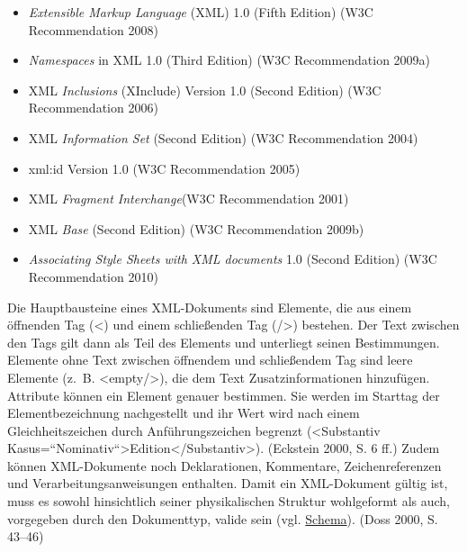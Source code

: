 \documentclass{article}
\begin{document}
        \begin{itemize}\item {\emph{Extensible Markup Language} (XML) 1.0 (Fifth Edition)
                        (W3C Recommendation 2008)}\item {\emph{Namespaces} in XML 1.0 (Third Edition) (W3C
                        Recommendation 2009a)}\item {XML \emph{Inclusions} (XInclude) Version 1.0 (Second
                     Edition) (W3C Recommendation 2006)}\item {XML \emph{Information Set }(Second Edition) (W3C
                        Recommendation 2004)}\item {xml:id Version 1.0 (W3C Recommendation 2005)}\item {XML \emph{Fragment Interchange}(W3C Recommendation 2001)}\item {XML \emph{Base} (Second Edition) (W3C Recommendation
                        2009b)}\item {\emph{Associating Style Sheets with XML documents }1.0 (Second
                     Edition) (W3C Recommendation 2010)}\end{itemize}Die Hauptbausteine eines XML-Dokuments sind Elemente, die aus einem öffnenden Tag
                  (<) und einem schließenden Tag (/>) bestehen. Der Text zwischen den Tags
                  gilt dann als Teil des Elements und unterliegt seinen Bestimmungen. Elemente ohne
                  Text zwischen öffnendem und schließendem Tag sind leere Elemente (z. B.
                     <empty/>), die dem Text Zusatzinformationen hinzufügen.
                  Attribute können ein Element genauer bestimmen. Sie werden im Starttag der
                  Elementbezeichnung nachgestellt und ihr Wert wird nach einem Gleichheitszeichen
                  durch Anführungszeichen begrenzt (<Substantiv
                  Kasus=“Nominativ“>Edition</Substantiv>). (Eckstein 2000, S. 6
                     ff.) Zudem können XML-Dokumente noch Deklarationen, Kommentare,
                  Zeichenreferenzen und Verarbeitungsanweisungen enthalten. Damit ein XML-Dokument
                  gültig ist, muss es sowohl hinsichtlich seiner physikalischen Struktur wohlgeformt
                  als auch, vorgegeben durch den Dokumenttyp, valide sein (vgl. \href{http://gams.uni-graz.at/o:konde.166}{Schema}). (Doss 2000, S. 43–46)\\
            
\end{document}
